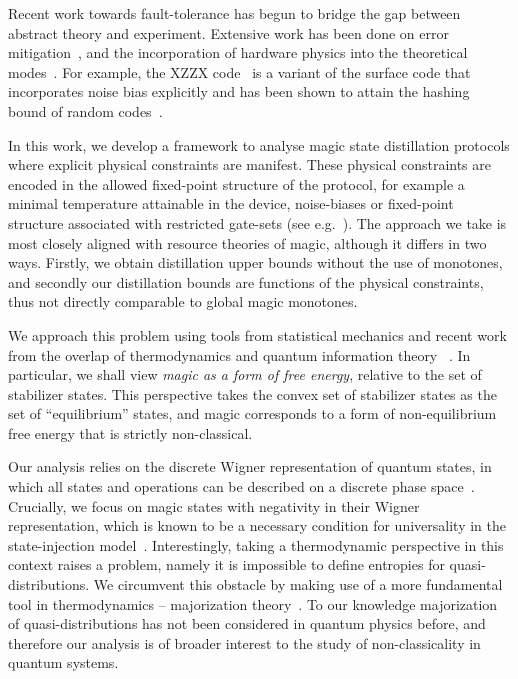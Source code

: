 \documentclass[pra,
aps,
twocolumn,
superscriptaddress,
groupedaddress,
nofootinbib,
reprint
]{revtex4-1}
\begin{document}
  
Recent work towards fault-tolerance has begun to bridge the gap between abstract theory and experiment. Extensive work has been done on error mitigation~\cite{Li_2017, Temme_2017, Endo_2018, McClean_2017}, and the incorporation of hardware physics into the theoretical modes~\cite{Kandala_2019, Colless_2018, song2018quantum, Bravyi_2021}. For example, the XZZX code~\cite{bonilla_ataides_xzzx_2021} is a variant of the surface code that incorporates noise bias explicitly and has been shown to attain the hashing bound of random codes~\cite{Bennett_1996}. 

In this work, we develop a framework to analyse magic state distillation protocols where explicit physical constraints are manifest. These physical constraints are encoded in the allowed fixed-point structure of the protocol, for example a minimal temperature attainable in the device, noise-biases or fixed-point structure associated with restricted gate-sets (see e.g.~\cite{Aliferis_2008, Stephens_2013, Li_2015, Babbush_2018, Tuckett_2019, Guillaud_2019, Fowler_2019}). The approach we take is most closely aligned with resource theories of magic, although it differs in two ways. Firstly, we obtain distillation upper bounds without the use of monotones, and secondly our distillation bounds are functions of the physical constraints, thus not directly comparable to global magic monotones.

We approach this problem using tools from statistical mechanics and recent work from the overlap of thermodynamics and quantum information theory~\cite{cit:gour, cit:gour2} . In particular, we shall view \emph{magic as a form of free energy}, relative to the set of stabilizer states. This perspective takes the convex set of stabilizer states as the set of ``equilibrium'' states, and magic corresponds to a form of non-equilibrium free energy that is strictly non-classical.

Our analysis relies on the discrete Wigner representation of quantum states, in which all states and operations can be described on a discrete phase space~\cite{Ferrie_2008, Okay_2021}. Crucially, we focus on magic states with negativity in their Wigner representation, which is known to be a necessary condition for universality in the state-injection model~\cite{cit:veitch, cit:mari, cit:gottesman, cit:knill, Campbell_2011}. Interestingly, taking a thermodynamic perspective in this context raises a problem, namely it is impossible to define entropies for quasi-distributions. We circumvent this obstacle by making use of a more fundamental tool in thermodynamics -- majorization theory~\cite{cit:marshall, Veinott_1971, Ruch_1976}. To our knowledge majorization of quasi-distributions has not been considered in quantum physics before, and therefore our analysis is of broader interest to the study of non-classicality in quantum systems.
\end{document}
